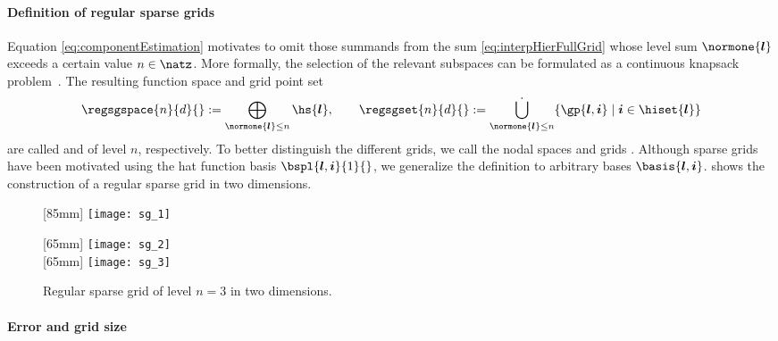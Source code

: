 \paragraph{Definition of regular sparse grids}

Equation \eqref{eq:componentEstimation} motivates to omit those summands
from the sum \eqref{eq:interpHierFullGrid} whose level sum $\normone{\*l}$
exceeds a certain value $n \in \natz$.
More formally, the selection of the relevant subspaces can be formulated as a
continuous knapsack problem~\cite{Bungartz04Sparse}.
The resulting function space and grid point set
\begin{equation}
  \regsgspace{n}{d}{}
  := \bigoplus_{\normone{\*l} \le n} \hs{\*l},\qquad
  \regsgset{n}{d}{}
  := \bigdotcup_{\normone{\*l} \le n}
  \{\gp{\*l,\*i} \mid \*i \in \hiset{\*l}\}
\end{equation}
are called  and
 of level $n$, respectively.
To better distinguish the different grids,
we call the nodal spaces and grids .
Although sparse grids have been motivated using the hat function
basis $\bspl{\*l,\*i}{1}{}$,
we generalize the definition to arbitrary bases $\basis{\*l,\*i}$.
 shows the construction of a
regular sparse grid in two dimensions.

\begin{figure}
  [85mm]{%
    \texttt{[image: sg\_1]}%
  }%
  \hfill%
  \begin{minipage}[b]{65mm}
    [65mm]{%
      \texttt{[image: sg\_2]}%
    }\\[5mm]%
    [65mm]{%
      \texttt{[image: sg\_3]}%
    }%
  \end{minipage}
  \caption{Regular sparse grid of level $n = 3$ in two dimensions.}
  \label{fig:regularSG}
\end{figure}

\paragraph{Error and grid size}

